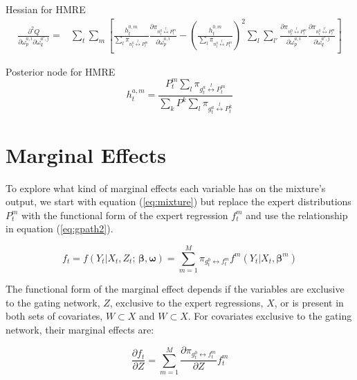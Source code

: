 \documentclass[12pt]{article}
\newcommand{\gateprod}[2]{\pi_{#1 \longleftrightarrow #2}}
\newcommand{\sumgateprod}[3]{\pi_{#1 \overset{#3}{\longleftrightarrow} #2}}
\newcommand{\shortsum}[1]{\sum \nolimits_{#1}}
\begin{document}
Hessian for HMRE
\begin{equation}
  \begin{split}
    \frac{\partial^{2} Q}{\partial \omega^{a,i}_{p} \partial \omega^{a',j}_{q}} =& \sum_{t} \sum_{m} \left[  \frac{h^{0,m}_{t}}{\sum_{l} \pi_{n^{0}_{t} \overset{l}{\longleftrightarrow} P^{m}_{t}}} \frac{\partial \pi_{n^{0}_{t} \overset{l}{\longleftrightarrow} P^{m}_{t}}}{\partial \omega^{a,i}_{p}} - \left( \frac{h^{0,m}_{t}}{\sum_{l} \pi_{n^{0}_{t} \overset{l}{\longleftrightarrow} P^{m}_{t}}} \right)^{2} \sum_{l} \sum_{l'} \frac{\partial \pi_{n^{0}_{t} \overset{l}{\longleftrightarrow} P^{m}_{t}}}{\partial \omega^{a,i}_{p}}  \frac{\partial \pi_{n^{0}_{t} \overset{l'}{\longleftrightarrow} P^{m}_{t}}}{\partial \omega^{a',j}_{q}} \right]
  \end{split}
\end{equation}


Posterior node for HMRE
\begin{equation} 
  h^{a,m}_{t} = \frac{P^{m}_{t} \shortsum{l} \sumgateprod{g^{a}_{t}}{P^{m}_{t}}{l}}{\sum_{k} P^{k} \shortsum{l} \sumgateprod{g^{a}_{t}}{P^{k}_{t}}{l}}
\end{equation}



\section{Marginal Effects} \label{sec:MarginalEffects}

To explore what kind of marginal effects each variable has on the mixture's 
output, we start with equation (\ref{eq:mixture}) but replace the
expert distributions $P^{m}_{t}$ with the functional form of the 
expert regression $f^{m}_{t}$ and use the relationship in equation
(\ref{eq:gpath2}). 

\begin{equation} \label{eq:mixture2}
  f_{t} = f(Y_{t} | X_{t}, Z_{t}; \, \boldsymbol{\beta}, \boldsymbol{\omega}) = \sum_{m=1}^{M} \gateprod{g^{0}_{t}}{f^{m}_{t}} f^{m}(Y_{t} | X_{t}, \boldsymbol{\beta}^{m})
\end{equation}

The functional form of the marginal effect depends if the variables are
exclusive to the gating network, $Z$, exclusive to the expert
regressions, $X$, or is present in both sets of covariates,
$W \subset X$ and $W \subset X$. For covariates
exclusive to the gating network, their marginal effects are:

\begin{equation} \label{eq:ME_gating}
  \frac{\partial f_{t}}{\partial Z} = \sum_{m=1}^{M} \frac{\partial \gateprod{g^{0}_{t}}{f^{m}_{t}}}{{\partial Z}}f^{m}_{t}
\end{equation}
\end{document}

